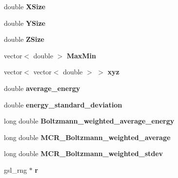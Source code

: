 \begin{DoxyCompactItemize}
\item 
\hypertarget{classMC_a0e8863dabcdbdefed9803ee9f6023d28}{
double {\bfseries XSize}}
\label{classMC_a0e8863dabcdbdefed9803ee9f6023d28}

\item 
\hypertarget{classMC_ab18ba1f0714aa8d783364e632cbaa650}{
double {\bfseries YSize}}
\label{classMC_ab18ba1f0714aa8d783364e632cbaa650}

\item 
\hypertarget{classMC_a5db17529053b92d5f12adbf6ea0685dd}{
double {\bfseries ZSize}}
\label{classMC_a5db17529053b92d5f12adbf6ea0685dd}

\item 
\hypertarget{classMC_a03df1036efa0fd050cb3a556756dcf40}{
vector$<$ double $>$ {\bfseries MaxMin}}
\label{classMC_a03df1036efa0fd050cb3a556756dcf40}

\item 
\hypertarget{classMC_ab4cc65fd3f605932c3026e156830f6a4}{
vector$<$ vector$<$ double $>$ $>$ {\bfseries xyz}}
\label{classMC_ab4cc65fd3f605932c3026e156830f6a4}

\item 
\hypertarget{classMC_abe5b7db589d8213d41d095a66453759c}{
double {\bfseries average\_\-energy}}
\label{classMC_abe5b7db589d8213d41d095a66453759c}

\item 
\hypertarget{classMC_a31ff549ef9d792da461a1eb2333d9b21}{
double {\bfseries energy\_\-standard\_\-deviation}}
\label{classMC_a31ff549ef9d792da461a1eb2333d9b21}

\item 
\hypertarget{classMC_aeba76a1547f351cb807f701accd9501c}{
long double {\bfseries Boltzmann\_\-weighted\_\-average\_\-energy}}
\label{classMC_aeba76a1547f351cb807f701accd9501c}

\item 
\hypertarget{classMC_abb7e7f9a571cc86372cac04766630741}{
long double {\bfseries MCR\_\-Boltzmann\_\-weighted\_\-average}}
\label{classMC_abb7e7f9a571cc86372cac04766630741}

\item 
\hypertarget{classMC_a4c56f3104200606b207432ca144456ce}{
long double {\bfseries MCR\_\-Boltzmann\_\-weighted\_\-stdev}}
\label{classMC_a4c56f3104200606b207432ca144456ce}

\item 
\hypertarget{classMC_af349b516b885d41993dab122cce9c0ae}{
gsl\_\-rng $\ast$ {\bfseries r}}
\label{classMC_af349b516b885d41993dab122cce9c0ae}


\end{DoxyCompactItemize}
